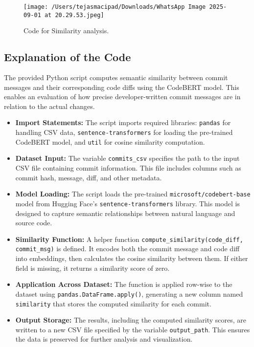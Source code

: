 \documentclass[12pt,a4paper]{article}
\begin{document}
\begin{figure}[h!]
    \centering
    \texttt{[image: /Users/tejasmacipad/Downloads/WhatsApp Image 2025-09-01 at 20.29.53.jpeg]}
    \caption{Code for Similarity analysis.}
\end{figure}

\subsection*{Explanation of the Code}

The provided Python script computes semantic similarity between commit messages and their corresponding code diffs using the CodeBERT model. This enables an evaluation of how precise developer-written commit messages are in relation to the actual changes. 

\begin{itemize}
    \item \textbf{Import Statements:} The script imports required libraries: \texttt{pandas} for handling CSV data, \texttt{sentence-transformers} for loading the pre-trained CodeBERT model, and \texttt{util} for cosine similarity computation.
    
    \item \textbf{Dataset Input:} The variable \texttt{commits\_csv} specifies the path to the input CSV file containing commit information. This file includes columns such as commit hash, message, diff, and other metadata.
    
    \item \textbf{Model Loading:} The script loads the pre-trained \texttt{microsoft/codebert-base} model from Hugging Face’s \texttt{sentence-transformers} library. This model is designed to capture semantic relationships between natural language and source code.
    
    \item \textbf{Similarity Function:} A helper function \texttt{compute\_similarity(code\_diff, commit\_msg)} is defined. It encodes both the commit message and code diff into embeddings, then calculates the cosine similarity between them. If either field is missing, it returns a similarity score of zero.
    
    \item \textbf{Application Across Dataset:} The function is applied row-wise to the dataset using \texttt{pandas.DataFrame.apply()}, generating a new column named \texttt{similarity} that stores the computed similarity for each commit.
    
    \item \textbf{Output Storage:} The results, including the computed similarity scores, are written to a new CSV file specified by the variable \texttt{output\_path}. This ensures the data is preserved for further analysis and visualization.
\end{itemize}
\end{document}
